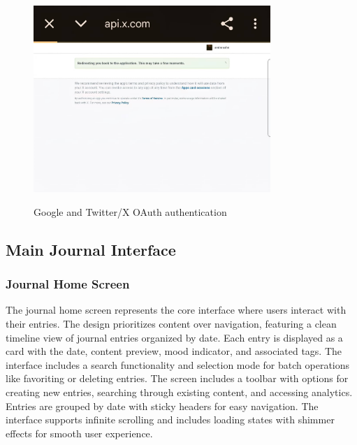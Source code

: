 \begin{figure}[H]
\begin{minipage}{0.4\textwidth}
\caption{Google and Twitter/X OAuth authentication}
\label{fig:google-oauth}
\end{minipage}
\hfill
\begin{minipage}{0.4\textwidth}
\centering
\includegraphics[width=0.8\textwidth]{files/imgs/prototype/x_oauth.jpeg}
\label{fig:twitter-oauth}
\end{minipage}
\end{figure}

\subsection{Main Journal Interface}

\subsubsection{Journal Home Screen}

The journal home screen represents the core interface where users interact with their entries. The design prioritizes content over navigation, featuring a clean timeline view of journal entries organized by date. Each entry is displayed as a card with the date, content preview, mood indicator, and associated tags. The interface includes a search functionality and selection mode for batch operations like favoriting or deleting entries. The screen includes a toolbar with options for creating new entries, searching through existing content, and accessing analytics. Entries are grouped by date with sticky headers for easy navigation. The interface supports infinite scrolling and includes loading states with shimmer effects for smooth user experience.

